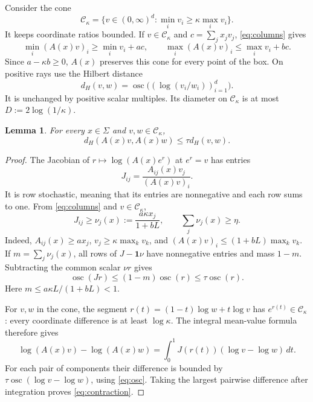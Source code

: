 \documentclass[11pt]{article}
\newtheorem{lemma}{Lemma}
\newcommand{\one}{\mathbf 1}
\newcommand{\osc}{\operatorname{osc}}
\begin{document}
Consider the cone
\[
 \mathcal C_\kappa=\{v\in(0,\infty)^d:
               \min_i v_i\geq\kappa\max_i v_i\}.
\]
It keeps coordinate ratios bounded. If $v\in\mathcal C_\kappa$ and
$c=\sum_j x_jv_j$, \eqref{eq:columns} gives
\[
 \min_i(A(x)v)_i\geq\min_i v_i+ac,
 \qquad
 \max_i(A(x)v)_i\leq\max_i v_i+bc.
\]
Since $a-\kappa b\geq0$, $A(x)$ preserves this cone for every point of
the box. On positive rays use the Hilbert distance
\[
 d_H(v,w)=\osc\big((\log(v_i/w_i))_{i=1}^d\big).
\]
It is unchanged by positive scalar multiples. Its diameter on
$\mathcal C_\kappa$ is at most $D:=2\log(1/\kappa)$.

\begin{lemma}\label{lem:contraction}
For every $x\in\Sigma$ and $v,w\in\mathcal C_\kappa$,
\begin{equation}\label{eq:contraction}
 d_H(A(x)v,A(x)w)\leq\tau d_H(v,w).
\end{equation}
\end{lemma}
\begin{proof}
The Jacobian of $r\mapsto\log(A(x)e^r)$ at $e^r=v$ has entries
\[
 J_{ij}=\frac{A_{ij}(x)v_j}{(A(x)v)_i}.
\]
It is row stochastic, meaning that its entries are nonnegative and each
row sums to one. From \eqref{eq:columns} and $v\in\mathcal C_\kappa$,
\begin{equation}\label{eq:common-row}
 J_{ij}\geq\nu_j(x):=\frac{a\kappa x_j}{1+bL},\qquad
 \sum_j\nu_j(x)\geq\eta.
\end{equation}
Indeed, $A_{ij}(x)\geq ax_j$, $v_j\geq\kappa\max_kv_k$, and
$(A(x)v)_i\leq(1+bL)\max_kv_k$.
If $m=\sum_j\nu_j(x)$, all rows of $J-\one\nu$ have nonnegative
entries and mass $1-m$. Subtracting the common scalar $\nu r$ gives
\begin{equation}\label{eq:osc}
 \osc(Jr)\leq(1-m)\osc(r)\leq\tau\osc(r).
\end{equation}
Here $m\leq a\kappa L/(1+bL)<1$.

For $v,w$ in the cone, the segment
$r(t)=(1-t)\log w+t\log v$ has $e^{r(t)}\in\mathcal C_\kappa$:
every coordinate difference is at least $\log\kappa$.
The integral mean-value formula therefore gives
\[
 \log(A(x)v)-\log(A(x)w)
 =\int_0^1 J(r(t))(\log v-\log w)\,dt.
\]
For each pair of components their difference is bounded by
$\tau\osc(\log v-\log w)$, using \eqref{eq:osc}. Taking the largest
pairwise difference after integration proves \eqref{eq:contraction}.
\end{proof}
\end{document}
